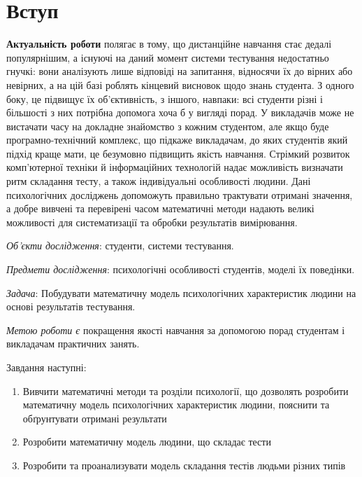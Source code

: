 \chapter*{Вступ}

\textbf{Актуальність роботи} полягає в тому, що
дистанційне навчання стає дедалі популярнішим, а
існуючі на даний момент системи тестування недостатньо гнучкі: вони
аналізують лише відповіді на запитання, відносячи їх до вірних або невірних,
а на цій базі роблять кінцевий висновок щодо знань студента.
З одного боку, це підвищує їх об’єктивність, з іншого, навпаки: всі студенти
різні і більшості з них потрібна допомога хоча б у вигляді порад.
У викладачів може не вистачати часу на докладне знайомство з кожним студентом,
але якщо буде програмно-технічний комплекс, що підкаже викладачам, до яких
студентів який підхід краще мати, це безумовно підвищить якість навчання.
Стрімкий розвиток комп’ютерної техніки й інформаційних технологій надає
можливість визначати ритм складання тесту, а також індивідуальні особливості
людини.
Дані психологічних досліджень допоможуть правильно трактувати отримані
значення, а добре вивчені та перевірені часом математичні методи надають
великі можливості для систематизації та обробки результатів вимірювання.

\textit{Об’єкти дослідження}:
студенти, системи тестування.

\textit{Предмети дослідження}:
психологічні особливості студентів, моделі їх поведінки.

\textit{Задача}:
Побудувати математичну модель психологічних характеристик людини на основі
результатів тестування.

\textit{Метою роботи є}
покращення якості навчання за допомогою порад студентам і викладачам
практичних занять.

Завдання наступні:
\begin{enumerate}
  \item
    Вивчити математичні методи та розділи психології, що дозволять розробити
    математичну модель психологічних характеристик людини,
    пояснити та обґрунтувати отримані результати
  \item
    Розробити математичну модель людини, що складає тести
  \item
    Розробити та проанализувати модель складання тестів людьми різних типів
\end{enumerate}

